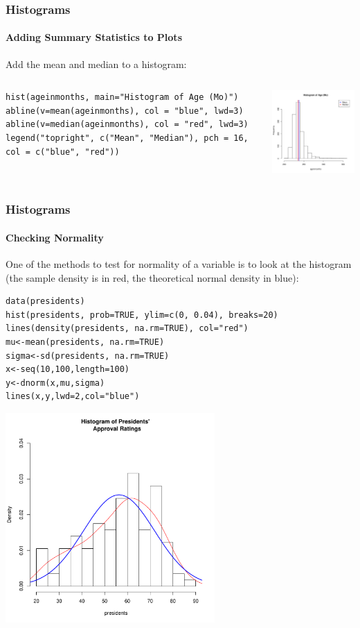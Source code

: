 \begin{frame}[fragile]
\frametitle{Histograms}
  \framesubtitle{Adding Summary Statistics to Plots}
Add the mean and median to a histogram:
    \begin{columns}

\begin{lstlisting}
hist(ageinmonths, main="Histogram of Age (Mo)")
abline(v=mean(ageinmonths), col = "blue", lwd=3)
abline(v=median(ageinmonths), col = "red", lwd=3)
legend("topright", c("Mean", "Median"), pch = 16, col = c("blue", "red"))
\end{lstlisting}

\begin{center}
\includegraphics[width = 45mm]{images/hist_meanmed.pdf}
\end{center}

\end{columns}
\end{frame}

\begin{frame}
\frametitle{Histograms}
\framesubtitle{Checking Normality}

One of the methods to test for normality of a variable is to look at the histogram (the sample density is in red, the theoretical normal density in blue):
  		\begin{lstlisting}
data(presidents)		
hist(presidents, prob=TRUE, ylim=c(0, 0.04), breaks=20)
lines(density(presidents, na.rm=TRUE), col="red")
mu<-mean(presidents, na.rm=TRUE) 
sigma<-sd(presidents, na.rm=TRUE)
x<-seq(10,100,length=100) 
y<-dnorm(x,mu,sigma) 
lines(x,y,lwd=2,col="blue") 
		\end{lstlisting}

        \begin{center}
         \includegraphics[width=0.6\textwidth]{images/presHist.pdf}
        \end{center}
\end{frame}


